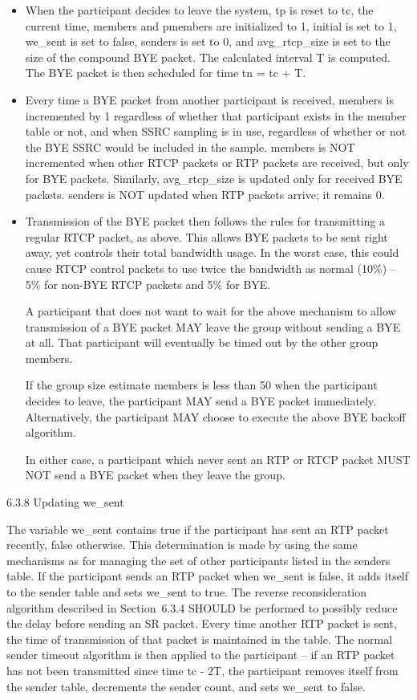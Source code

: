 \documentclass{article}
\begin{document}
\begin{itemize}
\item When the participant decides to leave the system, tp is reset to tc, the current time, members and pmembers are initialized to 1, initial is set to 1, we\_sent is set to false, senders is set to 0, and avg\_rtcp\_size is set to the size of the compound BYE packet. The calculated interval T is computed.  The BYE packet is then scheduled for time tn = tc + T.
\item Every time a BYE packet from another participant is received, members is incremented by 1 regardless of whether that participant exists in the member table or not, and when SSRC sampling is in use, regardless of whether or not the BYE SSRC would be included in the sample.  members is NOT incremented when other RTCP packets or RTP packets are received, but only for BYE packets.  Similarly, avg\_rtcp\_size is updated only for received BYE packets.  senders is NOT updated when RTP packets arrive; it remains 0.
\item Transmission of the BYE packet then follows the rules for transmitting a regular RTCP packet, as above.
This allows BYE packets to be sent right away, yet controls their total bandwidth usage.  In the worst case, this could cause RTCP control packets to use twice the bandwidth as normal (10\%) -- 5\% for non-BYE RTCP packets and 5\% for BYE.

A participant that does not want to wait for the above mechanism to allow transmission of a BYE packet MAY leave the group without sending a BYE at all.  That participant will eventually be timed out by the other group members.

If the group size estimate members is less than 50 when the participant decides to leave, the participant MAY send a BYE packet immediately.  Alternatively, the participant MAY choose to execute the above BYE backoff algorithm.

In either case, a participant which never sent an RTP or RTCP packet MUST NOT send a BYE packet when they leave the group.

\end{itemize}
6.3.8 Updating we\_sent

The variable we\_sent contains true if the participant has sent an RTP packet recently, false otherwise.  This determination is made by using the same mechanisms as for managing the set of other participants listed in the senders table.  If the participant sends an RTP packet when we\_sent is false, it adds itself to the sender table and sets we\_sent to true.  The reverse reconsideration algorithm described in Section~6.3.4 SHOULD be performed to possibly reduce the delay before sending an SR packet.  Every time another RTP packet is sent, the time of transmission of that packet is maintained in the table.  The normal sender timeout algorithm is then applied to the participant -- if an RTP packet has not been transmitted since time tc - 2T, the participant removes itself from the sender table, decrements the sender count, and sets we\_sent to false.
\end{document}
